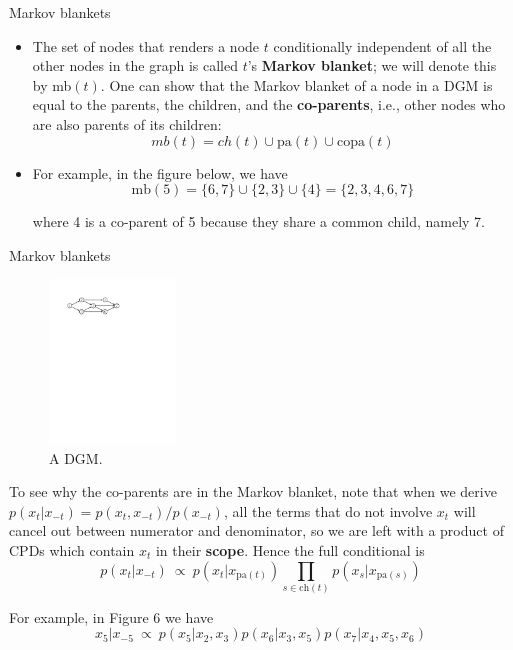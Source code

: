 \documentclass[10pt,mathserif]{beamer}
\begin{document}
\begin{frame}{Markov blankets}
\begin{itemize}
\item The set of nodes that renders a node $t$ conditionally independent of all the other nodes in the graph is called $t$'s \textbf{Markov blanket}; we will denote this by mb$(t)$. One can show that the Markov blanket of a node in a DGM is equal to the parents, the children, and the \textbf{co-parents}, i.e., other nodes who are also parents of its children:
\begin{equation}
    mb(t) = ch(t) \cup \text{pa}(t) \cup \text{copa}(t)
\end{equation}

\item For example, in the figure below, we have
\begin{equation}
    \text{mb}(5) = \{6, 7\} \cup \{2, 3\} \cup \{4\} = \{2, 3, 4, 6, 7\}
\end{equation}

where 4 is a co-parent of 5 because they share a common child, namely 7.
\end{itemize}
\end{frame}

\begin{frame}{Markov blankets}
\begin{figure}[h]
\centering
\includegraphics[width=0.3\textwidth]{DGMseven}
\caption{A DGM.}
\end{figure}

To see why the co-parents are in the Markov blanket, note that when we derive $p(x_{t} |x_{-t}) = p(x_{t}, x_{-t} )/p(x_{-t} )$, all the terms that do not involve $x_{t}$ will cancel out between numerator and denominator, so we are left with a product of CPDs which contain $x_{t}$ in their \textbf{scope}. Hence the full conditional is
\begin{equation}
    p(x_{t} |x_{-t}) \ \propto \ p(x_{t} |x_{\text{pa}(t)}) \prod_{s\in\text{ch}(t)} p(x_s |x_{\text{pa}(s)})
\end{equation}

For example, in Figure 6 we have
\begin{equation}
    x_{5} |x_{-5} \ \propto \ p(x_5|x_2, x_3)p(x_6|x_3, x_5)p(x_7|x_4, x_5, x_6)
\end{equation}   
\end{frame}
\end{document}
